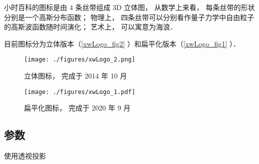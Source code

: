 
\begin{issues}
\issueDraft
{}
\end{issues}

小时百科的图标是由 4 条丝带组成 3D 立体图， 从数学上来看， 每条丝带的形状分别是一个高斯分布函数； 物理上， 四条丝带可以分别看作量子力学中自由粒子的高斯波函数随时间演化； 艺术上， 可以寓意为海浪．

目前图标分为立体版本（\autoref{xwLogo_fig2} ）和扁平化版本（\autoref{xwLogo_fig1} ）．

\begin{figure}[ht]
\centering
\texttt{[image: ./figures/xwLogo\_2.png]}
\caption{立体图标， 完成于 2014 年 10 月} \label{xwLogo_fig2}
\end{figure}

\begin{figure}[ht]
\centering
\texttt{[image: ./figures/xwLogo\_1.pdf]}
\caption{扁平化图标， 完成于 2020 年 9 月} \label{xwLogo_fig1}
\end{figure}

\subsection{参数}
使用透视投影